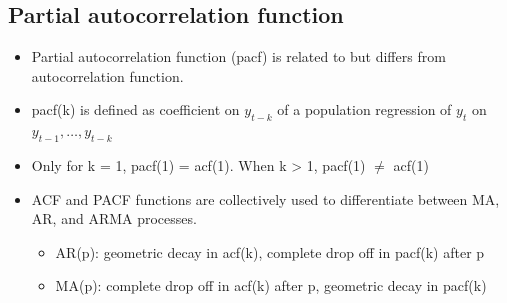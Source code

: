 \documentclass{article}
\begin{document}
\subsection{Partial autocorrelation function}
\begin{itemize}
  \item Partial autocorrelation function (pacf) is related to but differs from autocorrelation function.
  \item pacf(k) is defined as coefficient on $y_{t-k}$ of a population regression of $y_t$ on $y_{t-1}, \dots, y_{t-k}$
  \item Only for k = 1, pacf(1) = acf(1). When k > 1, pacf(1) $\neq$ acf(1)
  \item ACF and PACF functions are collectively used to differentiate between MA, AR, and ARMA processes.
  \begin{itemize}
    \item AR(p): geometric decay in acf(k), complete drop off in pacf(k) after p
    \item MA(p): complete drop off in acf(k) after p, geometric decay in pacf(k)
  \end{itemize}
\end{itemize}
\end{document}
